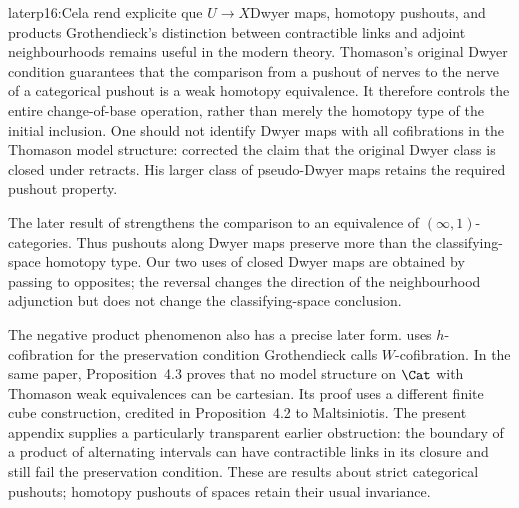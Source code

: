 \begin{dcomment}{later}{p16:Cela rend explicite que $U \longrightarrow X$}{Dwyer maps, homotopy pushouts, and products}
Grothendieck's distinction between contractible links and adjoint neighbourhoods remains useful in the modern theory. Thomason's original Dwyer condition guarantees that the comparison from a pushout of nerves to the nerve of a categorical pushout is a weak homotopy equivalence. It therefore controls the entire change-of-base operation, rather than merely the homotopy type of the initial inclusion. One should not identify Dwyer maps with all cofibrations in the Thomason model structure: \citet[Lemma~4 and Proposition~2]{Cisinski1999Dwyer} corrected the claim that the original Dwyer class is closed under retracts. His larger class of pseudo-Dwyer maps retains the required pushout property.

The later result of \citet[Theorems~1.5--1.6]{HackneyOzornovaRiehlRovelli2024} strengthens the comparison to an equivalence of $(\infty,1)$-categories. Thus pushouts along Dwyer maps preserve more than the classifying-space homotopy type. Our two uses of closed Dwyer maps are obtained by passing to opposites; the reversal changes the direction of the neighbourhood adjunction but does not change the classifying-space conclusion.

The negative product phenomenon also has a precise later form. \citet[Definition~2.6]{Pavlov2024Thomason} uses $h$-cofibration for the preservation condition Grothendieck calls $W$-cofibration. In the same paper, Proposition~4.3 proves that no model structure on $\Cat$ with Thomason weak equivalences can be cartesian. Its proof uses a different finite cube construction, credited in Proposition~4.2 to Maltsiniotis. The present appendix supplies a particularly transparent earlier obstruction: the boundary of a product of alternating intervals can have contractible links in its closure and still fail the preservation condition. These are results about strict categorical pushouts; homotopy pushouts of spaces retain their usual invariance.
\end{dcomment}

